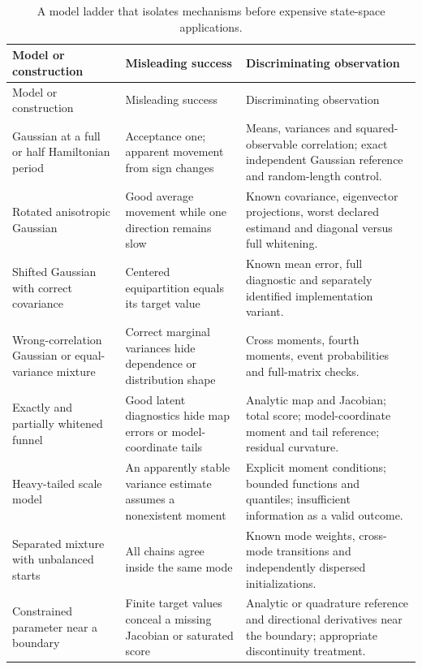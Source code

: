 \begin{longtable}{>{\raggedright\arraybackslash}p{}
>{\raggedright\arraybackslash}p{}
>{\raggedright\arraybackslash}p{}}
\caption{A model ladder that isolates mechanisms before expensive
state-space applications.}
\label{tab:bf-modern-tests}\\
\toprule
Model or construction & Misleading success & Discriminating observation\\
\midrule
\endfirsthead
\toprule Model or construction & Misleading success & Discriminating observation\\
\midrule
\endhead
\bottomrule
\endfoot
Gaussian at a full or half Hamiltonian period &
Acceptance one; apparent movement from sign changes &
Means, variances and squared-observable correlation; exact independent
Gaussian reference and random-length control.\\
Rotated anisotropic Gaussian &
Good average movement while one direction remains slow &
Known covariance, eigenvector projections, worst declared estimand and
diagonal versus full whitening.\\
Shifted Gaussian with correct covariance &
Centered equipartition equals its target value &
Known mean error, full diagnostic and separately identified implementation
variant.\\
Wrong-correlation Gaussian or equal-variance mixture &
Correct marginal variances hide dependence or distribution shape &
Cross moments, fourth moments, event probabilities and full-matrix checks.\\
Exactly and partially whitened funnel &
Good latent diagnostics hide map errors or model-coordinate tails &
Analytic map and Jacobian; total score; model-coordinate moment and tail
reference; residual curvature.\\
Heavy-tailed scale model &
An apparently stable variance estimate assumes a nonexistent moment &
Explicit moment conditions; bounded functions and quantiles; insufficient
information as a valid outcome.\\
Separated mixture with unbalanced starts &
All chains agree inside the same mode &
Known mode weights, cross-mode transitions and independently dispersed
initializations.\\
Constrained parameter near a boundary &
Finite target values conceal a missing Jacobian or saturated score &
Analytic or quadrature reference and directional derivatives near the
boundary; appropriate discontinuity treatment.\\

\end{longtable}
